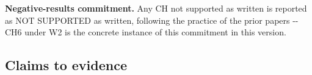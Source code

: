\documentclass[11pt,a4paper]{article}
\theoremstyle{definition}
\begin{document}
\begin{table}[H]
\centering
\caption{CH8 robustness readout: does each hypothesis's registered decision rule hold on every one of the 30 seeds (and, for CH6, both workflows).}
\end{table}

\noindent\textbf{Negative-results commitment.} Any CH not supported as written is reported as NOT SUPPORTED as written, following the practice of the prior papers -{}- CH6 under W2 is the concrete instance of this commitment in this version.

\subsection*{Claims to evidence}
\end{document}
